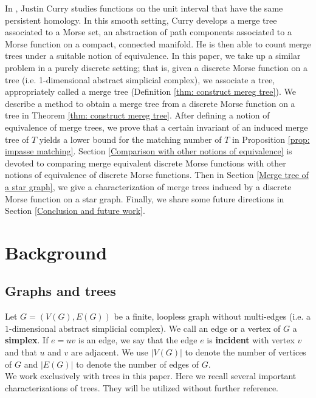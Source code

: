 \documentclass{article}
\theoremstyle{definition}
\begin{document}
In \cite{Curry-2017}, Justin Curry studies functions on the unit interval that have the same persistent homology.  In this smooth setting, Curry develops a merge tree associated to a Morse set, an abstraction of path components associated to a Morse function on a compact, connected manifold. He is then able to count merge trees under a suitable notion of equivalence.  In this paper, we take up a similar problem in a purely discrete setting; that is, given a discrete Morse function on a tree (i.e. 1-dimensional abstract simplicial complex), we associate a tree, appropriately called a merge tree (Definition \ref{thm: construct mereg tree}). We describe a method to obtain a merge tree from a discrete Morse function on a tree in Theorem \ref{thm: construct mereg tree}.  After defining a notion of equivalence of merge trees, we prove that a certain invariant of an induced merge tree of $T$ yields a lower bound for the matching number of $T$ in Proposition \ref{prop: impasse matching}. Section \ref{Comparison with other notions of equivalence} is devoted to comparing merge equivalent discrete Morse functions with other notions of equivalence of discrete Morse functions.   Then in Section \ref{Merge tree of a star graph}, we give a characterization of merge trees induced by a discrete Morse function on a star graph. Finally, we share some future directions in Section \ref{Conclusion and future work}.






\section{Background}

\subsection{Graphs and trees}

Let $G=(V(G),E(G))$ be a finite, loopless graph without multi-edges (i.e. a $1$-dimensional abstract simplicial complex).   We call an edge or a vertex of $G$ a \textbf{simplex}. If $e=uv$ is an edge, we say that the edge $e$ is \textbf{incident} with vertex $v$ and that $u$ and $v$ are adjacent. We use $|V(G)|$ to denote the number of vertices of $G$ and $|E(G)|$ to denote the number of edges of $G$.\\

We work exclusively with trees in this paper.  Here we recall several important characterizations of trees.  They will be utilized without further reference.
\end{document}
